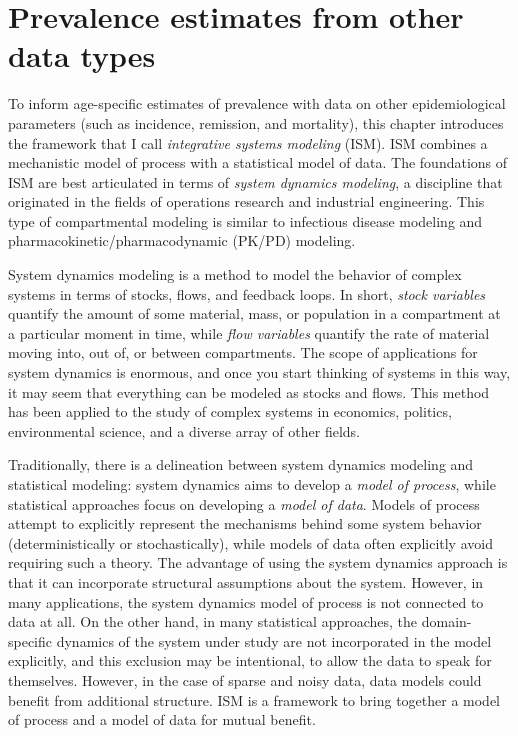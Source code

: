 \chapter{Prevalence estimates from other data types}
\label{theory-system_dynamics}

To inform age-specific estimates of prevalence with data on
other epidemiological parameters (such as incidence, remission, and
mortality), this chapter introduces the framework that I call
\emph{integrative systems modeling} (ISM).  ISM combines a mechanistic model of
process with a statistical model of data.  The foundations of ISM are
best articulated in terms of \emph{system dynamics modeling}, a
discipline that originated in the fields of operations research and
industrial engineering. \cite{forrester_industrial_1961,
  forrester_urban_1969,forrester_world_1973,meadows_thinking_2008}
This type of compartmental modeling is similar to infectious disease
modeling \cite{hethcote_qualitative_1976,anderson_infectious_1992,
  diekmann_mathematical_2000,keeling_modeling_2008,
  vynnycky_introduction_2010} and pharmacokinetic/pharmacodynamic
(PK/PD) modeling.
\cite{sheiner_modelling_1972,jacquez_compartmental_1985,yuh_population_1994,
  barrett_saam_1998,jacquez_modeling_1999,atkinson_introduction_2007}

System dynamics modeling is a method to model the behavior of complex
systems in terms of stocks, flows, and feedback loops.  In short,
\emph{stock variables} quantify the amount of some material, mass, or
population in a compartment at a particular moment in time, while
\emph{flow variables} quantify the rate of material moving into, out
of, or between compartments. The scope of applications for system
dynamics is enormous, and once you start thinking of systems in this
way, it may seem that everything can be modeled as stocks and
flows. This method has been applied to the study of complex systems in
economics, politics, environmental science, and a diverse array of
other fields.  \cite{meadows_thinking_2008,jacquez_modeling_1999,
  harte_consider_1988,richardson_feedback_1991}


Traditionally, there is a delineation between system dynamics modeling
and statistical modeling: system dynamics aims to
develop a \emph{model of process}, while statistical approaches focus
on developing a \emph{model of data}. Models of process attempt to
explicitly represent the mechanisms behind some system behavior
(deterministically or stochastically), while models of data often
explicitly avoid requiring such a theory. The advantage of using the
system dynamics approach is that it can incorporate structural
assumptions about the system.  However, in many applications, the
system dynamics model of process is not connected to data at all.  On
the other hand, in many statistical approaches, the domain-specific
dynamics of the system under study are not incorporated in the model
explicitly, and this exclusion may be intentional, to allow the data
to speak for themselves.  However, in the case of sparse and noisy data, data
models could benefit from additional structure.  ISM
is a framework to bring together a model of process
and a model of data for mutual benefit.

